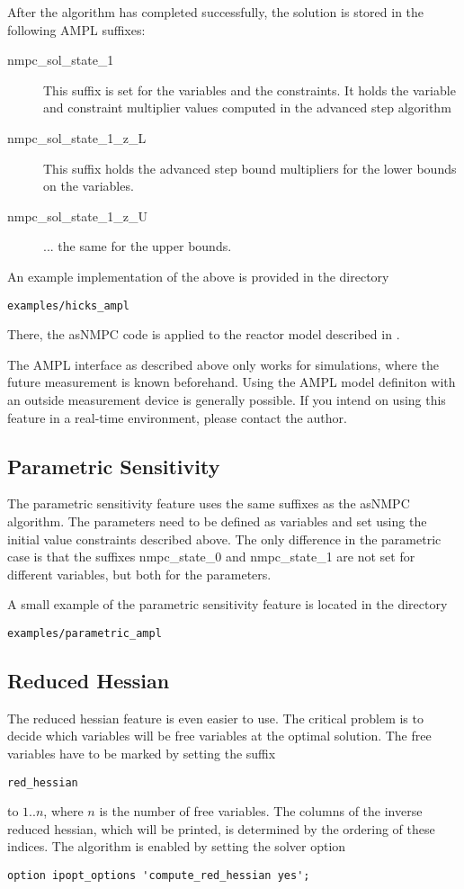 \documentclass[a4paper]{article}
\begin{document}
After the algorithm has completed successfully, the solution is stored in the following AMPL suffixes:
\begin{description}
\item[nmpc\_sol\_state\_1] This suffix is set for the variables and the constraints. It holds the variable and constraint multiplier values computed in the advanced step algorithm
\item[nmpc\_sol\_state\_1\_z\_L] This suffix holds the advanced step bound multipliers for the lower bounds on the variables.
\item[nmpc\_sol\_state\_1\_z\_U] ... the same for the upper bounds.
\end{description}

An example implementation of the above is provided in the directory 
\begin{verbatim}
examples/hicks_ampl
\end{verbatim} 
There, the asNMPC code is applied to the reactor model described in \cite{Hicks1971}.

The AMPL interface as described above only works for simulations, where the future measurement is known beforehand. Using the AMPL model definiton with an outside measurement device is generally possible. If you intend on using this feature in a real-time environment, please contact the author.
\subsection{Parametric Sensitivity}
The parametric sensitivity feature uses the same suffixes as the asNMPC algorithm. The parameters need to be defined as variables and set using the initial value constraints described above. The only difference in the parametric case is that the suffixes nmpc\_state\_0 and nmpc\_state\_1 are not set for different variables, but both for the parameters.

A small example of the parametric sensitivity feature is located in the directory
\begin{verbatim}
examples/parametric_ampl
\end{verbatim}
\subsection{Reduced Hessian}
The reduced hessian feature is even easier to use. The critical problem is to decide which variables will be free variables at the optimal solution. The free variables have to be marked by setting the suffix
\begin{verbatim}
red_hessian
\end{verbatim}
to $1..n$, where $n$ is the number of free variables. The columns of the inverse reduced hessian, which will be printed, is determined by the ordering of these indices. The algorithm is enabled by setting the solver option
\begin{verbatim}
option ipopt_options 'compute_red_hessian yes';
\end{verbatim}
\end{document}
